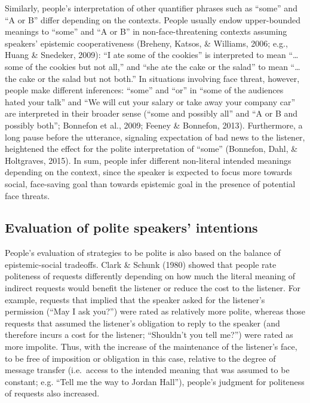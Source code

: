 \documentclass[oneside]{report}
\begin{document}
Similarly, people's interpretation of other quantifier phrases such as
``some'' and ``A or B'' differ depending on the contexts. People usually
endow upper-bounded meanings to ``some'' and ``A or B'' in
non-face-threatening contexts assuming speakers' epistemic
cooperativeness (Breheny, Katsos, \& Williams, 2006; e.g., Huang \&
Snedeker, 2009): ``I ate some of the cookies'' is interpreted to mean
``\ldots{} some of the cookies but not all,'' and ``she ate the cake or
the salad'' to mean ``\ldots{} the cake or the salad but not both.'' In
situations involving face threat, however, people make different
inferences: ``some'' and ``or'' in ``some of the audiences hated your
talk'' and ``We will cut your salary or take away your company car'' are
interpreted in their broader sense (``some and possibly all'' and ``A or
B and possibly both''; Bonnefon et al., 2009; Feeney \& Bonnefon, 2013).
Furthermore, a long pause before the utterance, signaling expectation of
bad news to the listener, heightened the effect for the polite
interpretation of ``some'' (Bonnefon, Dahl, \& Holtgraves, 2015). In
sum, people infer different non-literal intended meanings depending on
the context, since the speaker is expected to focus more towards social,
face-saving goal than towards epistemic goal in the presence of
potential face threats.

\subsection{Evaluation of polite speakers'
intentions}\label{evaluation-of-polite-speakers-intentions}

People's evaluation of strategies to be polite is also based on the
balance of epistemic-social tradeoffs. Clark \& Schunk (1980) showed
that people rate politeness of requests differently depending on how
much the literal meaning of indirect requests would benefit the listener
or reduce the cost to the listener. For example, requests that implied
that the speaker asked for the listener's permission (``May I ask
you?'') were rated as relatively more polite, whereas those requests
that assumed the listener's obligation to reply to the speaker (and
therefore incurs a cost for the listener; ``Shouldn't you tell me?'')
were rated as more impolite. Thus, with the increase of the maintenance
of the listener's face, to be free of imposition or obligation in this
case, relative to the degree of message transfer (i.e.~access to the
intended meaning that was assumed to be constant; e.g. ``Tell me the way
to Jordan Hall''), people's judgment for politeness of requests also
increased.
\end{document}
